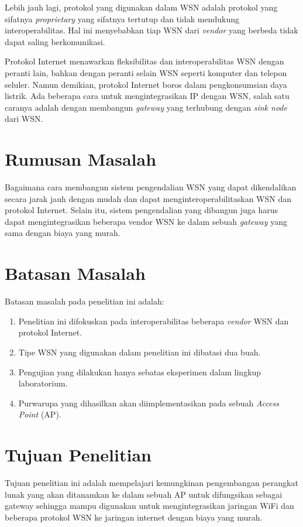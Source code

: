 Lebih jauh lagi, protokol yang digunakan dalam WSN adalah protokol yang sifatnya \emph{proprietary} yang sifatnya tertutup dan tidak mendukung interoperabilitas. Hal ini menyebabkan tiap WSN dari \emph{vendor} yang berbeda tidak dapat saling berkomunikasi.

Protokol Internet menawarkan fleksibilitas dan interoperabilitas WSN dengan peranti lain, bahkan dengan peranti selain WSN seperti komputer dan telepon seluler. Namun demikian, protokol Internet boros dalam pengkonsumsian daya listrik. Ada beberapa cara untuk mengintegrasikan IP dengan WSN, salah satu caranya adalah dengan membangun \emph{gateway} yang terhubung dengan \emph{sink node} dari WSN.


\section{Rumusan Masalah}
Bagaimana cara membangun sistem pengendalian WSN yang dapat dikendalikan secara jarak jauh dengan mudah dan dapat menginteroperabilitaskan WSN dan protokol Internet. Selain itu, sistem pengendalian yang dibangun juga harus dapat mengintegrasikan beberapa vendor WSN ke dalam sebuah \emph{gateway} yang sama dengan biaya yang murah.


\section{Batasan Masalah}
Batasan masalah pada penelitian ini adalah:
\begin{enumerate}
\item Penelitian ini difokuskan pada interoperabilitas beberapa \emph{vendor} WSN dan protokol Internet.
\item Tipe WSN yang digunakan dalam penelitian ini dibatasi dua buah.
\item Pengujian yang dilakukan hanya sebatas eksperimen dalam lingkup laboratorium.
\item Purwarupa yang dihasilkan akan diimplementasikan pada sebuah \emph{Access Point} (AP).
\end{enumerate}


\section{Tujuan Penelitian}
Tujuan penelitian ini adalah mempelajari kemungkinan pengembangan perangkat lunak yang akan ditanamkan ke dalam sebuah AP untuk difungsikan sebagai gateway sehingga mampu digunakan untuk mengintegrasikan jaringan WiFi dan beberapa protokol WSN ke jaringan internet dengan biaya yang murah.


